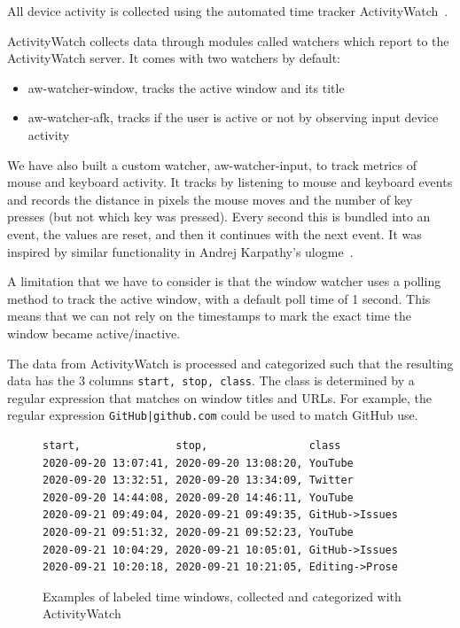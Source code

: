         All device activity is collected using the automated time tracker ActivityWatch~\cite{bjareholt_activitywatch_2020-1}.

        ActivityWatch collects data through modules called watchers which report to the ActivityWatch server. It comes with two watchers by default:

        \begin{itemize}
            \item aw-watcher-window, tracks the active window and its title
            \item aw-watcher-afk, tracks if the user is active or not by observing input device activity
        \end{itemize}

        We have also built a custom watcher, aw-watcher-input, to track metrics of mouse and keyboard activity. It tracks by listening to mouse and keyboard events and records the distance in pixels the mouse moves and the number of key presses (but not which key was pressed). Every second this is bundled into an event, the values are reset, and then it continues with the next event. It was inspired by similar functionality in Andrej Karpathy's ulogme~\cite{karpathy_ulogme_2016}.

        A limitation that we have to consider is that the window watcher uses a polling method to track the active window, with a default poll time of 1 second. This means that we can not rely on the timestamps to mark the exact time the window became active/inactive.

        The data from ActivityWatch is processed and categorized such that the resulting data has the 3 columns \texttt{start, stop, class}. The class is determined by a regular expression that matches on window titles and URLs. For example, the regular expression \texttt{GitHub|github.com} could be used to match GitHub use.

\begin{figure}[h]
\begin{verbatim}
start,               stop,                class
2020-09-20 13:07:41, 2020-09-20 13:08:20, YouTube
2020-09-20 13:32:51, 2020-09-20 13:34:09, Twitter
2020-09-20 14:44:08, 2020-09-20 14:46:11, YouTube
2020-09-21 09:49:04, 2020-09-21 09:49:35, GitHub->Issues
2020-09-21 09:51:32, 2020-09-21 09:52:23, YouTube
2020-09-21 10:04:29, 2020-09-21 10:05:01, GitHub->Issues
2020-09-21 10:20:18, 2020-09-21 10:21:05, Editing->Prose
\end{verbatim}
    \caption{Examples of labeled time windows, collected and categorized with ActivityWatch}\label{code:class-csv}
\end{figure}


